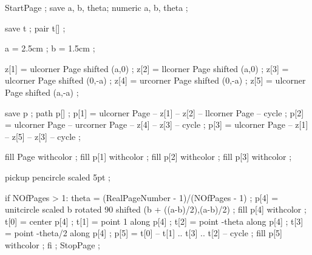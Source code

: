 StartPage ;
save a, b,  theta;
numeric a, b,  theta ;

save t ;
pair  t[] ;

a = 2.5cm ;
b = 1.5cm ;

z[1] = ulcorner Page shifted (a,0) ;
z[2] = llcorner Page shifted (a,0) ;
z[3] = ulcorner Page shifted (0,-a) ;
z[4] = urcorner Page shifted (0,-a) ;
z[5] = ulcorner Page shifted (a,-a) ;

save p ;
path p[] ;
p[1] = ulcorner Page -- z[1] -- z[2] -- llcorner Page -- cycle ;
p[2] = ulcorner Page -- urcorner Page -- z[4] -- z[3] -- cycle ;
p[3] = ulcorner Page -- z[1] -- z[5] -- z[3] -- cycle ;

fill Page withcolor  ;
fill p[1] withcolor  ;
fill p[2] withcolor  ;
fill p[3] withcolor  ;

pickup pencircle scaled 5pt ;

if NOfPages > 1:
	theta = (RealPageNumber - 1)/(NOfPages - 1) ;
	p[4] = unitcircle scaled b rotated 90 shifted (b + ((a-b)/2),(a-b)/2) ;
	fill p[4] withcolor  ;
	t[0] = center p[4] ;
	t[1] = point 1 along p[4] ;
	t[2] = point -theta along p[4] ;
	t[3] = point -theta/2 along p[4] ;
	p[5] = t[0] -- t[1] .. t[3] .. t[2] -- cycle ;
	fill p[5] withcolor  ;
fi ;
StopPage ;
\stopuseMPgraphic





\setupTitle[\c!headcolor={simpleslides:contrastcolor}]


\setupSlideTitle
   [\c!after=,
    \c!alternative=layer,
    \c!width=\textwidth,
    \c!height=2.5cm,
    \c!color=simpleslides:backgroundcolor]


\setupitemize[1][inmargin][color=simpleslides:backgroundcolor]

\protect
\stopmodule

\endinput

